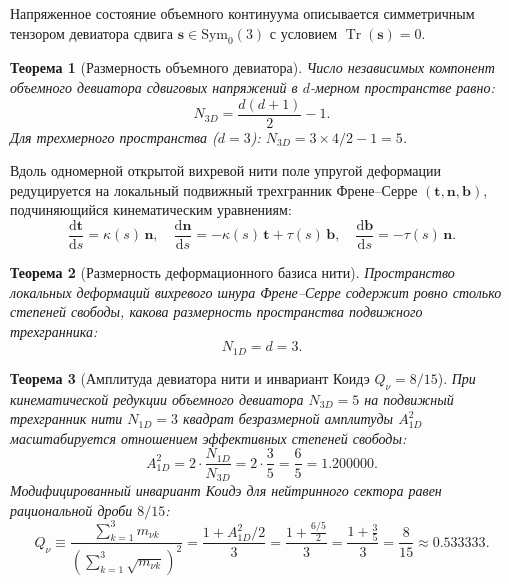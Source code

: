 \documentclass[11pt,a4paper]{article}
\newtheorem{theorem}{Теорема}
\theoremstyle{definition}
\theoremstyle{remark}
\begin{document}
Напряженное состояние объемного континуума описывается симметричным тензором девиатора сдвига $\mathbf{s} \in \mathrm{Sym}_0(3)$ с условием $\operatorname{Tr}(\mathbf{s}) = 0$.
	
\begin{theorem}[Размерность объемного девиатора]
\label{thm:deviator_dim_five}
Число независимых компонент объемного девиатора сдвиговых напряжений в $d$-мерном пространстве равно:
\begin{equation}
	N_{3D} = \frac{d(d + 1)}{2} - 1.
\label{eq:deviator_dim_formula}
\end{equation}
Для трехмерного пространства ($d = 3$): $N_{3D} = 3 \times 4 / 2 - 1 = 5$.
\end{theorem}
	
Вдоль одномерной открытой вихревой нити поле упругой деформации редуцируется на локальный подвижный трехгранник Френе--Серре $(\mathbf{t}, \mathbf{n}, \mathbf{b})$, подчиняющийся кинематическим уравнениям:
\begin{equation}
	\frac{\mathrm{d}\mathbf{t}}{\mathrm{d}s} = \kappa(s) \, \mathbf{n}, \quad
	\frac{\mathrm{d}\mathbf{n}}{\mathrm{d}s} = -\kappa(s) \, \mathbf{t} + \tau(s) \, \mathbf{b}, \quad
	\frac{\mathrm{d}\mathbf{b}}{\mathrm{d}s} = -\tau(s) \, \mathbf{n}.
\label{eq:frenet_serret_equations}
\end{equation}
	
\begin{theorem}[Размерность деформационного базиса нити]
\label{thm:frenet_basis_dim}
Пространство локальных деформаций вихревого шнура Френе--Серре содержит ровно столько степеней свободы, какова размерность пространства подвижного трехгранника:
\begin{equation}
	N_{1D} = d = 3.
\label{eq:frenet_dim_three}
\end{equation}
\end{theorem}
	
\begin{theorem}[Амплитуда девиатора нити и инвариант Коидэ $Q_\nu = 8/15$]
\label{thm:neutrino_koide_derivation}
При кинематической редукции объемного девиатора $N_{3D} = 5$ на подвижный трехгранник нити $N_{1D} = 3$ квадрат безразмерной амплитуды $A_{1D}^2$ масштабируется отношением эффективных степеней свободы:
\begin{equation}
	A_{1D}^2 = 2 \cdot \frac{N_{1D}}{N_{3D}} = 2 \cdot \frac{3}{5} = \frac{6}{5} = 1.200000.
\label{eq:amplitude_1D_exact}
\end{equation}
Модифицированный инвариант Коидэ для нейтринного сектора равен рациональной дроби $8/15$:
\begin{equation}
	Q_\nu \equiv \frac{\sum_{k=1}^3 m_{\nu k}}{\left(\sum_{k=1}^3 \sqrt{m_{\nu k}}\right)^2} = \frac{1 + A_{1D}^2 / 2}{3} = \frac{1 + \frac{6/5}{2}}{3} = \frac{1 + \frac{3}{5}}{3} = \frac{8}{15} \approx 0.533333.
	\label{eq:neutrino_koide_exact}
\end{equation}
\end{theorem}
\end{document}
